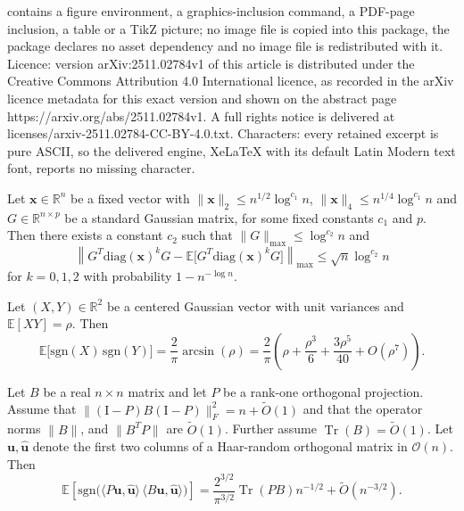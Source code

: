 \documentclass[10pt,a4paper]{amsart}
\newcommand\E{\mathbb{E}}
\newcommand\R{\mathbb{R}}
\newcommand\Tr{{\operatorname{Tr}}}
\newcommand\bu{\bm{u}}
\newcommand\hu{\hat{\bm u}}
\begin{document}
contains a figure environment, a graphics-inclusion command, a PDF-page inclusion, a table or a TikZ picture; no image file is copied into this package, the package declares no asset dependency and no image file is redistributed with it. Licence: version arXiv:2511.02784v1 of this article is distributed under the Creative Commons Attribution 4.0 International licence, as recorded in the arXiv licence metadata for this exact version and shown on the abstract page https://arxiv.org/abs/2511.02784v1. A full rights notice is delivered at licenses/arxiv-2511.02784-CC-BY-4.0.txt. Characters: every retained excerpt is pure ASCII, so the delivered engine, XeLaTeX with its default Latin Modern text font, reports no missing character.
\begin{lemma}\label{lm:typical}
Let $\bm{x} \in \mathbb{R}^{n}$ be a fixed vector with $\|\bm{x}\|_2 \le n^{1/2} \log^{c_1} n$, $\|\bm{x}\|_4 \le n^{1/4} \log^{c_1} n$ and $G \in \mathbb{R}^{n \times p}$ be a standard Gaussian matrix, for some fixed constants $c_1$ and $p$. Then there exists a constant $c_2$ such that $\|G\|_{\max} \le \log^{c_2} n$ and
\[\left\| G^T \mathrm{diag}(\bm{x})^k G - \E\big[ G^T \mathrm{diag}(\bm{x})^k G \big] \right\|_{\max} \le \sqrt{n} \log^{c_2} n\]
for $k = 0,1,2$ with probability $1 - n^{-\log n}$.
\end{lemma}

\begin{lemma}\label{lem: signArcsine}
Let $(X,Y)\in \R^2$ be a centered Gaussian vector with unit variances and $\E[XY] = \rho$.
Then
\[
\E\!\big[\mathrm{sgn}(X)\,\mathrm{sgn}(Y)\big]
=\frac{2}{\pi}\arcsin(\rho)=\frac{2}{\pi}\left(\rho+\frac{\rho^3}{6}+\frac{3\rho^5}{40}+O(\rho^7)\right).
\]
\end{lemma}

\begin{proposition}\label{prop:main_prop}
Let $B$ be a real $n\times n$ matrix and let $P$ be a rank-one orthogonal projection.
Assume that $\|(\mathrm{I}-P)B(\mathrm{I}-P)\|_{F}^2=n+\tilde{O}(1)$ and that the operator norms
$\|B\|$, and $\|B^{T}P\|$ are $\tilde{O}(1)$. Further assume $\Tr(B)=\tilde{O}(1)$.
Let $\bu,\hu$ denote the first two columns of a Haar-random orthogonal matrix in $\mathcal{O}(n)$. Then
\[
\E\!\left[\mathrm{sgn}\!\big(\langle P\bu,\hu\rangle\,
\langle B\bu,\hu\rangle\big)\right]
=\frac{2^{3/2}}{\pi^{3/2}}\Tr(PB)n^{-1/2}+\tilde{O}(n^{-3/2}).
\]
\end{proposition}
\end{document}

